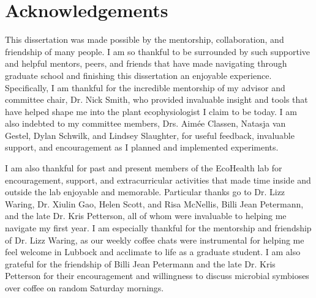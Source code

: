 \documentclass{ttuthes2007}
\begin{document}

\frontmatter

\chapter{\textbf{Acknowledgements}}
\noindent This dissertation was made possible by the mentorship, collaboration, and friendship of many people. I am so thankful to be surrounded by such supportive and helpful mentors, peers, and friends that have made navigating through graduate school and finishing this dissertation an enjoyable experience. Specifically, I am thankful for the incredible mentorship of my advisor and committee chair, Dr. Nick Smith, who provided invaluable insight and tools that have helped shape me into the plant ecophysiologist I claim to be today. I am also indebted to my committee members, Drs. Aimée Classen, Natasja van Gestel, Dylan Schwilk, and Lindsey Slaughter, for useful feedback, invaluable support, and encouragement as I planned and implemented experiments.

I am also thankful for past and present members of the EcoHealth lab for encouragement, support, and extracurricular activities that made time inside and outside the lab enjoyable and memorable. Particular thanks go to Dr. Lizz Waring, Dr. Xiulin Gao, Helen Scott, and Risa McNellis, Billi Jean Petermann, and the late Dr. Kris Petterson, all of whom were invaluable to helping me navigate my first year. I am especially thankful for the mentorship and friendship of Dr. Lizz Waring, as our weekly coffee chats were instrumental for helping me feel welcome in Lubbock and acclimate to life as a graduate student. I am also grateful for the friendship of Billi Jean Petermann and the late Dr. Kris Petterson for their encouragement and willingness to discuss microbial symbioses over coffee on random Saturday mornings.
\end{document}
